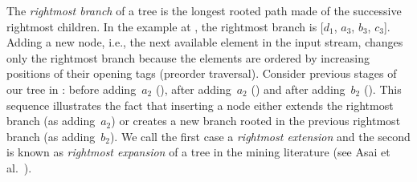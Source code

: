The \emph{rightmost branch} of a tree is the longest rooted path made
of the successive rightmost children. In the example at
, the rightmost branch is [\(d_1\), \(a_3\),
  \(b_3\), \(c_3\)]. Adding a new node, i.e., the next available
element in the input stream, changes only the rightmost branch because
the elements are ordered by increasing positions of their opening tags
(preorder traversal). Consider previous stages of our \XML tree in
: before adding~\(a_2\)
(), after adding~\(a_2\) ()
and after adding~\(b_2\) (). This sequence
illustrates the fact that inserting a node either extends the
rightmost branch (as adding~\(a_2\)) or creates a new branch rooted in
the previous rightmost branch (as adding~\(b_2\)). We call the first
case a \emph{rightmost extension} and the second is known as
\emph{rightmost expansion} of a tree in the mining literature (see
Asai et al.~\cite{Asai:2003}).




